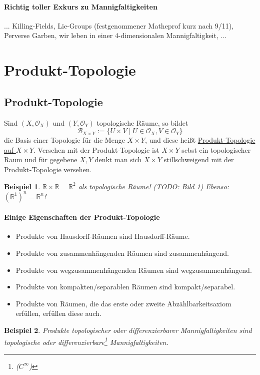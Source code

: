 \documentclass[a4paper,11pt,notitlepage]{report}
\newtheorem{example}{Beispiel}[chapter]
\newcommand{\R}{{\ensuremath{\mathbb{R}}}}
\newcommand{\OO}{{\ensuremath{\mathcal{O}}}}
\newenvironment{Kasten}[1]
{
\hspace{0.05\linewidth}
\begin{center}
\begin{minipage}{0.9\linewidth}
\setlength{\fboxsep}{10pt}
\definecolor{shadecolor}{gray}{1}
\definecolor{framecolor}{gray}{0}
\def\FrameCommand{\fcolorbox{framecolor}{shadecolor}}
\MakeFramed {\FrameRestore}
\subsection{#1}
\begin{itshape}
}
{
\end{itshape}
\endMakeFramed
\end{minipage}
\end{center}
}
\begin{document}
\paragraph{Richtig toller Exkurs zu Mannigfaltigkeiten}... Killing-Fields, Lie-Groups (festgenommener Matheprof kurz nach 9/11), Perverse Garben, wir leben in einer 4-dimensionalen Mannigfaltigkeit, ...

\newpage
\section{Produkt-Topologie}
\begin{Kasten}{Produkt-Topologie}
	Sind $(X, \OO_X)$ und $(Y, \OO_Y)$ topologische Räume, so bildet $$\mathcal{B}_{X \times Y} := \{U \times V \mid U \in \OO_X, V \in \OO_Y\}$$
	die Basis einer Topologie für die Menge $X \times Y$, und diese heißt \underline{Produkt-Topologie auf $X \times Y$}.
	\newline
	Versehen mit der Produkt-Topologie ist $X \times Y$ sebst ein topologischer Raum und für gegebene $X, Y$ denkt man sich $X \times Y$ stillschweigend mit der Produkt-Topologie versehen.
\end{Kasten}

\begin{example}
	$\R \times \R = \R^2$ als topologische Räume! (TODO: Bild 1)
	\newline
	Ebenso: $(\R^1)^n = \R^n$!
\end{example}

\paragraph{Einige Eigenschaften der Produkt-Topologie}
\begin{itemize}
	\item Produkte von Hausdorff-Räumen sind Hausdorff-Räume.
	\item Produkte von zusammenhängenden Räumen sind zusammenhängend.
	\item Produkte von wegzusammenhängenden Räumen sind wegzusammenhängend.
	\item Produkte von kompakten/separablen Räumen sind kompakt/separabel.
	\item Produkte von Räumen, die das erste oder zweite Abzählbarkeitsaxiom erfüllen, erfüllen diese auch.
\end{itemize}
 
\begin{example}
	Produkte topologischer oder differenzierbarer Mannigfaltigkeiten sind topologische oder differenzierbare\footnote{($C^\infty$)} Mannigfaltigkeiten.
\end{example} 
 
\end{document}
